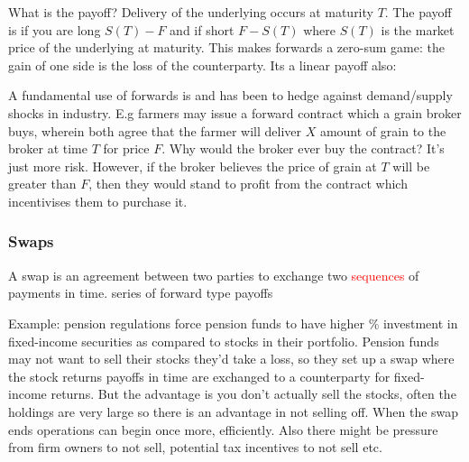 \documentclass[9pt]{extarticle}
\begin{document}
What is the payoff? Delivery of the underlying occurs at maturity $T$. The payoff 
is if you are long $S(T)-F$ and if short $F-S(T)$ where $S(T)$ is the market price of the underlying at maturity. This makes 
forwards a zero-sum game: the gain of one side is the loss of the counterparty. Its a linear payoff also:
\begin{center}
\end{center}
A fundamental use of forwards is and has been to hedge against demand/supply shocks in industry. E.g 
farmers may issue a forward contract which a grain broker buys, wherein both agree that 
the farmer will deliver $X$ amount of grain to the broker at time $T$ for price $F$. Why would the 
broker ever buy the contract? It's just more risk. However, if the broker believes the price of grain at 
$T$ will be greater than $F$, then they would stand to profit from the contract which incentivises them 
to purchase it.


\subsubsection{Swaps}

A swap is an agreement between two parties to exchange 
two \textcolor{red}{sequences} of payments in time. series of forward type payoffs

Example: pension regulations force pension funds to have higher \% investment in fixed-income securities 
as compared to stocks in their portfolio. Pension funds may not want to sell their stocks 
they'd take a loss, so they set up a swap where the stock returns payoffs in time 
are exchanged to a counterparty for fixed-income returns. But the advantage is you don't actually 
sell the stocks, often the holdings are very large so there is an advantage in not selling 
off. When the swap ends operations can begin once more, efficiently. Also there might 
be pressure from firm owners to not sell, potential tax incentives to not sell etc.
\end{document}
